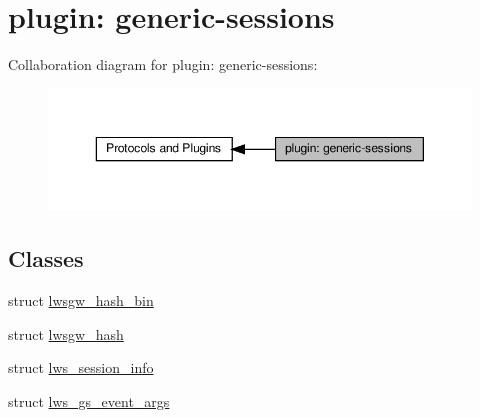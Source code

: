 \hypertarget{group__generic-sessions}{}\section{plugin\+: generic-\/sessions}
\label{group__generic-sessions}
Collaboration diagram for plugin\+: generic-\/sessions\+:
\nopagebreak
\begin{figure}[H]
\begin{center}
\leavevmode
\includegraphics[width=350pt]{group__generic-sessions}
\end{center}
\end{figure}
\subsection*{Classes}
\begin{DoxyCompactItemize}
\item 
struct \hyperlink{structlwsgw__hash__bin}{lwsgw\+\_\+hash\+\_\+bin}
\item 
struct \hyperlink{structlwsgw__hash}{lwsgw\+\_\+hash}
\item 
struct \hyperlink{structlws__session__info}{lws\+\_\+session\+\_\+info}
\item 
struct \hyperlink{structlws__gs__event__args}{lws\+\_\+gs\+\_\+event\+\_\+args}
\end{DoxyCompactItemize}
